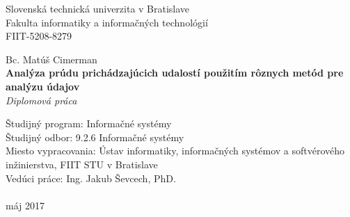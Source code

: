 \documentclass[12pt, a4paper, titlepage, slovak]{book}
\begin{document}
\begin{titlepage}
\begin{center}                                                                                                                                                   
{\Large Slovenská technická univerzita v Bratislave} \\
{\Large Fakulta informatiky a informačných technológií} \\
\vspace*{1\baselineskip}
\large {FIIT-5208-8279}
\vfill %


{{Bc. Matúš Cimerman}} \\
\vspace*{1\baselineskip}
{\LARGE {\textbf{Analýza prúdu prichádzajúcich udalostí použitím rôznych metód pre analýzu údajov}}} %
\\
\vspace*{1\baselineskip}
\textit{Diplomová práca}\\
\vfill %
\end{center}
{Študijný program: Informačné systémy}\\
{Študijný odbor: 9.2.6 Informačné systémy}\\
{Miesto vypracovania: Ústav informatiky, informačných systémov a softvérového inžinierstva, FIIT STU v Bratislave}\\
{Vedúci práce: Ing. Jakub Ševcech, PhD.}\\
\\
{máj 2017}

\end{titlepage}
\restoregeometry
\thispagestyle{empty}
\emptydoublepage

%

%
%

%


\emptydoublepage


\emptydoublepage
\end{document}

